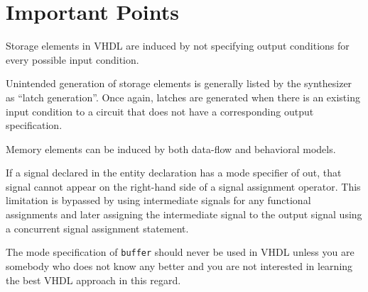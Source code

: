 \section{Important Points}
\begin{my_list}
\item Storage elements in VHDL are induced by not specifying output conditions for every possible input condition.

\item Unintended generation of storage elements is generally listed by the synthesizer as ``latch generation''. Once again, latches are generated when there is an existing input condition to a circuit that does not have a corresponding output specification.

\item Memory elements can be induced by both data-flow and behavioral models.

\item If a signal declared in the entity declaration has a mode specifier of out, that signal cannot appear on the right-hand side of a signal assignment operator. This limitation is bypassed by using intermediate signals for any functional assignments and later assigning the intermediate signal to the output signal using a concurrent signal assignment statement.

\item The mode specification of \texttt{buffer} should never be used in VHDL unless you are somebody who does not know any better and you are not interested in learning the best VHDL approach in this regard.
\end{my_list}

